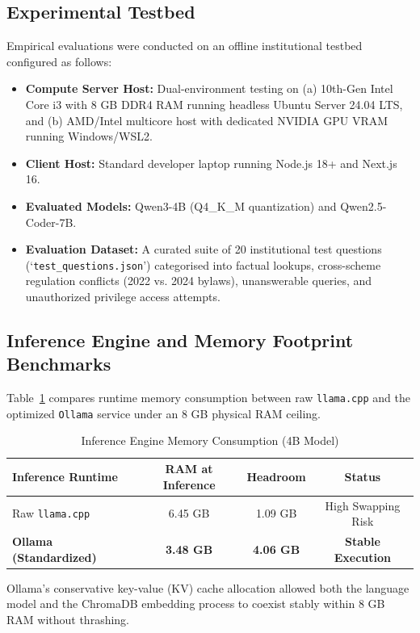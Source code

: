 \documentclass[conference]{IEEEtran}
\begin{document}
\subsection{Experimental Testbed}
Empirical evaluations were conducted on an offline institutional testbed configured as follows:
\begin{itemize}
    \item \textbf{Compute Server Host:} Dual-environment testing on (a) 10th-Gen Intel Core i3 with 8 GB DDR4 RAM running headless Ubuntu Server 24.04 LTS, and (b) AMD/Intel multicore host with dedicated NVIDIA GPU VRAM running Windows/WSL2.
    \item \textbf{Client Host:} Standard developer laptop running Node.js 18+ and Next.js 16.
    \item \textbf{Evaluated Models:} Qwen3-4B (Q4\_K\_M quantization) and Qwen2.5-Coder-7B.
    \item \textbf{Evaluation Dataset:} A curated suite of 20 institutional test questions (`\texttt{test\_questions.json}') categorised into factual lookups, cross-scheme regulation conflicts (2022 vs. 2024 bylaws), unanswerable queries, and unauthorized privilege access attempts.
\end{itemize}

\subsection{Inference Engine and Memory Footprint Benchmarks}
Table~\ref{tab:engine_benchmarks} compares runtime memory consumption between raw \texttt{llama.cpp} and the optimized \texttt{Ollama} service under an 8 GB physical RAM ceiling.

\begin{table}[htbp]
\centering
\caption{Inference Engine Memory Consumption (4B Model)}
\label{tab:engine_benchmarks}
\begin{tabular}{@{}lccc@{}}
\toprule
\textbf{Inference Runtime} & \textbf{RAM at Inference} & \textbf{Headroom} & \textbf{Status} \\
\midrule
Raw \texttt{llama.cpp} & 6.45 GB & 1.09 GB & High Swapping Risk \\
\textbf{Ollama (Standardized)} & \textbf{3.48 GB} & \textbf{4.06 GB} & \textbf{Stable Execution} \\
\bottomrule
\end{tabular}
\end{table}

Ollama's conservative key-value (KV) cache allocation allowed both the language model and the ChromaDB embedding process to coexist stably within 8 GB RAM without thrashing.
\end{document}
